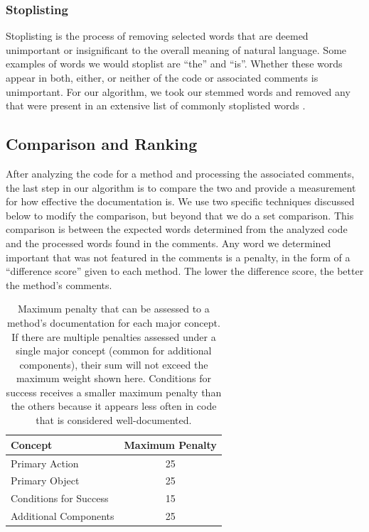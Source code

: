 \documentclass[preprint]{sigplanconf}
\begin{document}
\subsubsection{Stoplisting}
Stoplisting is the process of removing selected words that are deemed unimportant or insignificant to the overall meaning of natural language. Some examples of words we would stoplist are ``the'' and ``is''. Whether these words appear in both, either, or neither of the code or associated comments is unimportant. For our algorithm, we took our stemmed words and removed any that were present in an extensive list of commonly stoplisted words \cite{xpo6}.

\subsection{Comparison and Ranking}
After analyzing the code for a method and processing the associated comments, the last step in our algorithm is to compare the two and provide a measurement for how effective the documentation is. We use two specific techniques discussed below to modify the comparison, but beyond that we do a set comparison.
This comparison is between the expected words determined from the analyzed code and the processed words found in the comments. Any word we determined important that was not featured in the comments is a penalty, in the form of a ``difference score'' given to each method. The lower the difference score, the better the method's comments.

\begin{table}
	\begin{center}
		\begin{tabular}{ l | c }
		Concept & Maximum Penalty \\
		\hline
		Primary Action & 25 \\
		Primary Object & 25 \\
		Conditions for Success & 15 \\
		Additional Components & 25 \\
		\end{tabular}
	\end{center}
	\caption{Maximum penalty that can be assessed to a method's documentation for each major concept. If there are multiple penalties assessed under a single major concept (common for additional components), their sum will not exceed the maximum weight shown here. Conditions for success receives a smaller maximum penalty than the others because it appears less often in code that is considered well-documented.}
	\label{table-concept-penalty}
\end{table}
\end{document}
